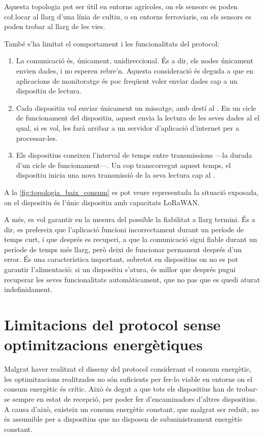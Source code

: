 \documentclass{tfgitic}[2024/07/01]
\begin{document}
{Aquesta topologia pot ser útil en entorns agrícoles, on els sensors es poden co\l.locar al llarg d'una línia de cultiu, o en entorns ferroviaris, on els sensors es poden trobar al llarg de les vies. 

També s'ha limitat el comportament i les funcionalitats del protocol:
\begin{enumerate}
    \item La comunicació és, únicament, unidireccional. És a dir, els nodes únicament envien dades, i no esperen rebre'n. Aquesta consideració és deguda a que en aplicacions de monitoratge és poc freqüent voler enviar dades cap a un dispositiu de lectura.
    \item Cada dispositiu vol enviar únicament un missatge, amb destí al . En un cicle de funcionament del dispositiu, aquest envia la lectura de les seves dades al  el qual, si es vol, les farà arribar a un servidor d'aplicació d'internet per a processar-les.
    \item Els dispositius coneixen l'interval de temps entre transmissions ---la durada d'un cicle de funcionament---. Un cop transcorregut aquest temps, el dispositiu inicia una nova transmissió de la seva lectura cap al .
\end{enumerate}

A la \autoref{fig:topologia_baix_consum} es pot veure representada la situació exposada, on el dispositiu  és l'únic dispositiu amb capacitats LoRaWAN.

A més, es vol garantir en la mesura del possible la fiabilitat a llarg termini. És a dir, es prefereix que l'aplicació funcioni incorrectament durant un període de temps curt, i que després es recuperi, a que la comunicació sigui fiable durant un període de temps més llarg, però deixi de funcionar permanent després d'un error. És una característica important, sobretot en dispositius on no es pot garantir l'alimentació: si un dispositiu s'atura, és millor que després pugui recuperar les seves funcionalitats automàticament, que no pas que es quedi aturat indefinidament.


\section{Limitacions del protocol sense optimitzacions energètiques}
Malgrat haver realitzat el disseny del protocol considerant el consum energètic, les optimitzacions realitzades no són suficients per fer-lo viable en entorns on el consum energètic és crític. Això és degut a que tots els dispositius han de trobar-se sempre en estat de recepció, per poder fer d'encaminadors d'altres dispositius. A causa d'això, existeix un consum energètic constant, que malgrat ser reduït, no és assumible per a dispositius que no disposen de subministrament energètic constant.

}
\end{document}
